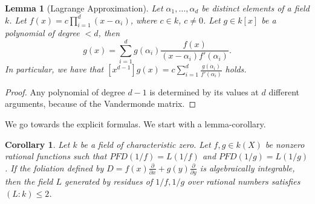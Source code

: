 \documentclass{amsart}
\newtheorem{lemma}[thm]{Lemma}
\newtheorem{cor}[thm]{Corollary}
\theoremstyle{definition}
\begin{document}
\begin{lemma}[Lagrange Approximation]\label{lem: Lagrange Approximation}
    Let $\alpha_1,\ldots,\alpha_d$ be distinct elements of a field $k$. Let $f(x)=c\prod_{i=1}^d(x-\alpha_i)$, where $c\in k$, $c\ne 0$. Let $g\in k[x]$ be a polynomial of degree $<d$, then
    \[
    g(x)=\sum_{i=1}^d g(\alpha_i)\frac{f(x)}{(x-\alpha_i)f'(\alpha_i)}.
    \]
    In particular, we have that 
    $
    [x^{d-1}]g(x)=c\sum_{i=1}^d \frac{g(\alpha_i)}{f'(\alpha_i)}
    $ holds. 
\end{lemma}

\begin{proof}
    Any polynomial of degree $d-1$ is determined by its values at $d$ different arguments, because of the Vandermonde matrix.
\end{proof}

We go towards the explicit formulas. We start with a lemma-corollary.

\begin{cor}\label{cor: degree no more than 2}
    Let $k$ be a field of characteristic zero.
    Let $f,g\in k(X)$ be nonzero rational functions such that $PFD(1/f)=L(1/f)$ and $PFD(1/g)=L(1/g)$. If the foliation defined by
    $D= f(x)\frac{\partial}{\partial x} +g(y)\frac{\partial}{\partial y}$ is algebraically integrable, then the field $L$ generated by residues of $1/f,1/g$ over rational numbers satisfies $(L:k)\le 2$.
\end{cor}
\end{document}
